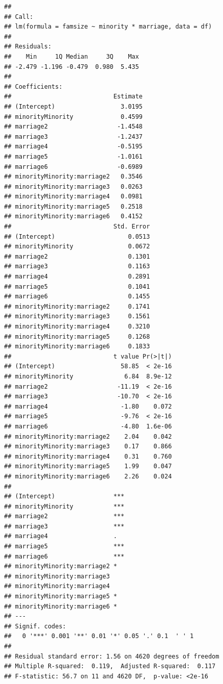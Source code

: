 \documentclass[]{tufte-book}
\theoremstyle{definition}
\theoremstyle{definition}
\theoremstyle{remark}
\begin{document}
\begin{verbatim}
## 
## Call:
## lm(formula = famsize ~ minority * marriage, data = df)
## 
## Residuals:
##    Min     1Q Median     3Q    Max 
## -2.479 -1.196 -0.479  0.980  5.435 
## 
## Coefficients:
##                            Estimate
## (Intercept)                  3.0195
## minorityMinority             0.4599
## marriage2                   -1.4548
## marriage3                   -1.2437
## marriage4                   -0.5195
## marriage5                   -1.0161
## marriage6                   -0.6989
## minorityMinority:marriage2   0.3546
## minorityMinority:marriage3   0.0263
## minorityMinority:marriage4   0.0981
## minorityMinority:marriage5   0.2518
## minorityMinority:marriage6   0.4152
##                            Std. Error
## (Intercept)                    0.0513
## minorityMinority               0.0672
## marriage2                      0.1301
## marriage3                      0.1163
## marriage4                      0.2891
## marriage5                      0.1041
## marriage6                      0.1455
## minorityMinority:marriage2     0.1741
## minorityMinority:marriage3     0.1561
## minorityMinority:marriage4     0.3210
## minorityMinority:marriage5     0.1268
## minorityMinority:marriage6     0.1833
##                            t value Pr(>|t|)
## (Intercept)                  58.85  < 2e-16
## minorityMinority              6.84  8.9e-12
## marriage2                   -11.19  < 2e-16
## marriage3                   -10.70  < 2e-16
## marriage4                    -1.80    0.072
## marriage5                    -9.76  < 2e-16
## marriage6                    -4.80  1.6e-06
## minorityMinority:marriage2    2.04    0.042
## minorityMinority:marriage3    0.17    0.866
## minorityMinority:marriage4    0.31    0.760
## minorityMinority:marriage5    1.99    0.047
## minorityMinority:marriage6    2.26    0.024
##                               
## (Intercept)                ***
## minorityMinority           ***
## marriage2                  ***
## marriage3                  ***
## marriage4                  .  
## marriage5                  ***
## marriage6                  ***
## minorityMinority:marriage2 *  
## minorityMinority:marriage3    
## minorityMinority:marriage4    
## minorityMinority:marriage5 *  
## minorityMinority:marriage6 *  
## ---
## Signif. codes:  
##   0 '***' 0.001 '**' 0.01 '*' 0.05 '.' 0.1  ' ' 1
## 
## Residual standard error: 1.56 on 4620 degrees of freedom
## Multiple R-squared:  0.119,  Adjusted R-squared:  0.117 
## F-statistic: 56.7 on 11 and 4620 DF,  p-value: <2e-16
\end{verbatim}
\end{document}
